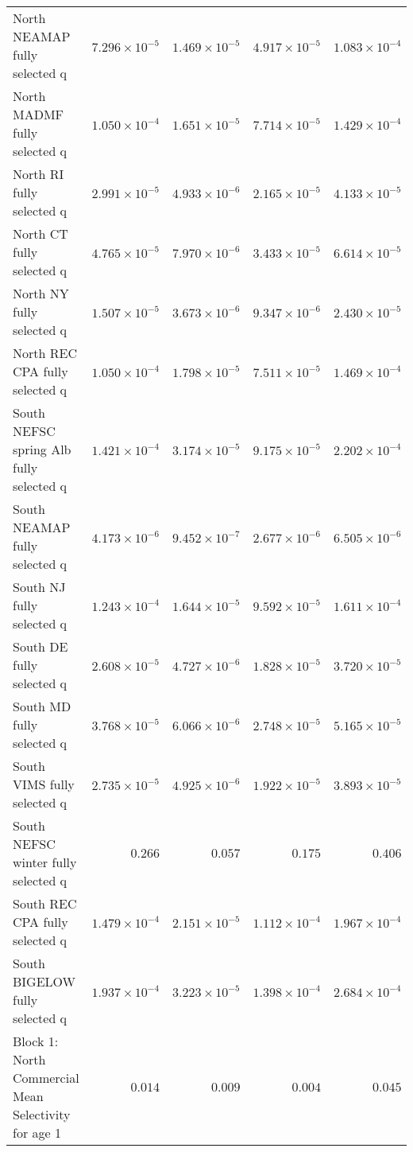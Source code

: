 \documentclass[
]{article}
\begin{document}
\begin{landscape}
\begin{longtable}[t]{lrrrr}
\addlinespace
North NEAMAP fully selected q & $7.296\times 10^{-5}$ & $1.469\times 10^{-5}$ & $4.917\times 10^{-5}$ & $1.083\times 10^{-4}$\\
North MADMF fully selected q & $1.050\times 10^{-4}$ & $1.651\times 10^{-5}$ & $7.714\times 10^{-5}$ & $1.429\times 10^{-4}$\\
North RI fully selected q & $2.991\times 10^{-5}$ & $4.933\times 10^{-6}$ & $2.165\times 10^{-5}$ & $4.133\times 10^{-5}$\\
North CT fully selected q & $4.765\times 10^{-5}$ & $7.970\times 10^{-6}$ & $3.433\times 10^{-5}$ & $6.614\times 10^{-5}$\\
North NY fully selected q & $1.507\times 10^{-5}$ & $3.673\times 10^{-6}$ & $9.347\times 10^{-6}$ & $2.430\times 10^{-5}$\\
\addlinespace
North REC CPA fully selected q & $1.050\times 10^{-4}$ & $1.798\times 10^{-5}$ & $7.511\times 10^{-5}$ & $1.469\times 10^{-4}$\\
South NEFSC spring Alb fully selected q & $1.421\times 10^{-4}$ & $3.174\times 10^{-5}$ & $9.175\times 10^{-5}$ & $2.202\times 10^{-4}$\\
South NEAMAP fully selected q & $4.173\times 10^{-6}$ & $9.452\times 10^{-7}$ & $2.677\times 10^{-6}$ & $6.505\times 10^{-6}$\\
South NJ fully selected q & $1.243\times 10^{-4}$ & $1.644\times 10^{-5}$ & $9.592\times 10^{-5}$ & $1.611\times 10^{-4}$\\
South DE fully selected q & $2.608\times 10^{-5}$ & $4.727\times 10^{-6}$ & $1.828\times 10^{-5}$ & $3.720\times 10^{-5}$\\
\addlinespace
South MD fully selected q & $3.768\times 10^{-5}$ & $6.066\times 10^{-6}$ & $2.748\times 10^{-5}$ & $5.165\times 10^{-5}$\\
South VIMS fully selected q & $2.735\times 10^{-5}$ & $4.925\times 10^{-6}$ & $1.922\times 10^{-5}$ & $3.893\times 10^{-5}$\\
South NEFSC winter fully selected q & $0.266$ & $0.057$ & $0.175$ & $0.406$\\
South REC CPA fully selected q & $1.479\times 10^{-4}$ & $2.151\times 10^{-5}$ & $1.112\times 10^{-4}$ & $1.967\times 10^{-4}$\\
South BIGELOW fully selected q & $1.937\times 10^{-4}$ & $3.223\times 10^{-5}$ & $1.398\times 10^{-4}$ & $2.684\times 10^{-4}$\\
\addlinespace
Block 1: North Commercial Mean Selectivity for age 1 & $0.014$ & $0.009$ & $0.004$ & $0.045$\\

\end{longtable}
\end{landscape}
\end{document}
